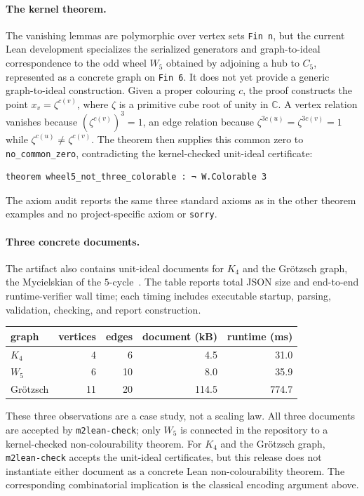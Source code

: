 \documentclass[11pt]{article}
\newcommand{\CC}{\mathbb{C}}
\newcommand{\code}[1]{\texttt{#1}}
\begin{document}
\paragraph{The kernel theorem.}
The vanishing lemmas are polymorphic over vertex sets \code{Fin n}, but
the current Lean development specializes the serialized generators and
graph-to-ideal correspondence to the odd wheel $W_5$ obtained by
adjoining a hub to $C_5$, represented as a concrete graph on
\code{Fin 6}.  It does not yet provide a generic graph-to-ideal
construction.  Given a
proper colouring $c$, the proof constructs the point
$x_v=\zeta^{c(v)}$, where $\zeta$ is a primitive cube root of unity in
$\CC$.  A vertex relation vanishes because
$(\zeta^{c(v)})^3=1$, an edge relation because
$\zeta^{3c(u)}=\zeta^{3c(v)}=1$ while $\zeta^{c(u)}\ne\zeta^{c(v)}$.
The theorem then supplies this common zero to
\code{no\_common\_zero}, contradicting the kernel-checked unit-ideal
certificate:
\begin{lstlisting}[style=leanstyle]
theorem wheel5_not_three_colorable : ¬ W.Colorable 3
\end{lstlisting}
The axiom audit reports the same three standard axioms as in the other
theorem examples and no project-specific axiom or \code{sorry}.

\paragraph{Three concrete documents.}
The artifact also contains unit-ideal documents for $K_4$ and the
Gr\"otzsch graph, the Mycielskian of the $5$-cycle~\cite{mycielski}.
The table reports total JSON size and end-to-end runtime-verifier wall
time; each timing includes executable startup, parsing, validation,
checking, and report construction.
\begin{center}
\small
\begin{tabular}{lrrrr}
\toprule
graph & vertices & edges & document (kB) & runtime (ms) \\
\midrule
$K_4$                       & 4  & 6  & 4.5 & 31.0 \\
$W_5$                       & 6  & 10 & 8.0 & 35.9 \\
Gr\"otzsch                  & 11 & 20 & 114.5 & 774.7 \\
\bottomrule
\end{tabular}
\end{center}
These three observations are a case study, not a scaling law.  All
three documents are accepted by \code{m2lean-check}; only $W_5$ is
connected in the repository to a kernel-checked non-colourability
theorem.  For $K_4$ and the Gr\"otzsch graph,
\code{m2lean-check} accepts the unit-ideal certificates, but this
release does not instantiate either document as a concrete Lean
non-colourability theorem.  The corresponding combinatorial implication
is the classical encoding argument above.
\end{document}
